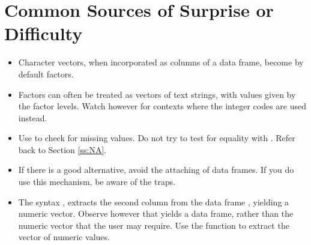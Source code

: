 \section{Common Sources of Surprise or Difficulty}\label{sec:difficult}
\begin{itemize}
\item[] Character vectors, when incorporated as columns of a data frame,
become by default factors.

\item[] Factors can often be treated as vectors of text strings, with
values given by the factor levels. Watch however for contexts where
the integer codes are used instead.

\item[] Use  to check for missing values.  Do not try
  to test for equality with .  Refer back to Section
  \ref{ss:NA}.

\item[] If there is a good alternative, avoid the attaching of data
  frames.   If you do use this mechanism, be aware of the traps.

\item[] The syntax , extracts the second
  column from the data frame , yielding a numeric
  vector.  Observe however that  yields a
  data frame, rather than the numeric vector that the user may
  require.  Use the function  to extract the vector
of numeric values.
\end{itemize}

